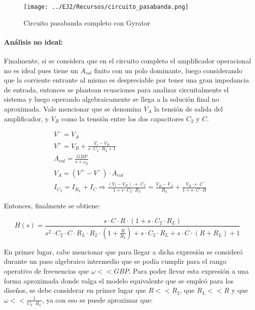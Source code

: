\begin{figure}[H]
    \centering
    \texttt{[image: ../EJ2/Recursos/circuito\_pasabanda.png]}
    \caption{Circuito pasabanda completo con Gyrator}
    \label{fig:circuito_pasabanda}
\end{figure}

\paragraph*{An\'alisis no ideal:} Finalmente, si se considera que en el circuito completo el amplificador operacional no es ideal pues tiene un $A_{vol}$ finito con un polo dominante, luego considerando que la corriente entrante al mismo es despreciable por tener
una gran impedancia de entrada, entonces se plantean ecuaciones para analizar circuitalmente el sistema y luego operando algebraicamente se llega a la soluci\'on final no aproximada. Vale mencionar que se denomina $V_A$ la tensi\'on de salida del amplificador,
y $V_B$ como la tensi\'on entre los dos capacitores $C_2$ y $C$.

\begin{align}
    & V^{-} = V_A \\
    & V^{+} = V_B + \frac{V_i - V_B}{s \cdot C_2 \cdot R_2 + 1} \\
    & A_{vol} = \frac{GBP}{s + \omega_p} \\
    & V_A = (V^{+} - V^{-}) \cdot A_{vol} \\
    & I_{C_2} = I_{R_L} + I_C \Rightarrow \frac{(V_i - V_B) \cdot s \cdot C_2}{1 + s \cdot C_2 \cdot R_2} = \frac{V_B - V_A}{R_L} + \frac{V_B \cdot s \cdot C}{1 + s \cdot C \cdot R}
\end{align}

Entonces, finalmente se obtiene:

\begin{equation}
    H(s) = \frac{s \cdot C \cdot R \cdot (1 + s \cdot C_2 \cdot R_L)}{s^{2} \cdot C_2 \cdot C \cdot R_L \cdot R_2 \cdot (1 + \frac{R}{R_2}) + s \cdot C_2 \cdot R_L + s \cdot C \cdot (R + R_L) + 1}
\end{equation}

En primer lugar, cabe mencionar que para llegar a dicha expresi\'on se consider\'o durante un paso algebraico intermedio que se pod\'ia cumplir para el rango operativo de frecuencias que $\omega << GBP$. Para poder llevar esta expresi\'on a una forma
aproximada donde valga el modelo equivalente que se emple\'o para los dise\~nos, se debe considerar en primer lugar que $R << R_2$, que $R_L << R$ y que $\omega << \frac{1}{C_2 \cdot R_L}$, ya con eso se puede aproximar que:

